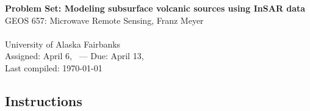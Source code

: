 \documentclass[11pt,titlepage,fleqn]{article}
\begin{document}

\begin{spacing}{1.2}
\centering
{\large \bf Problem Set: Modeling subsurface volcanic sources using InSAR data} \\
GEOS 657: Microwave Remote Sensing, Franz Meyer \\
\cltag\ \\
University of Alaska Fairbanks \\
Assigned: April 6, \cyear\ --- Due: April 13, \cyear\ \\
Last compiled: \today
\end{spacing}


\subsection*{Instructions}
\end{document}
